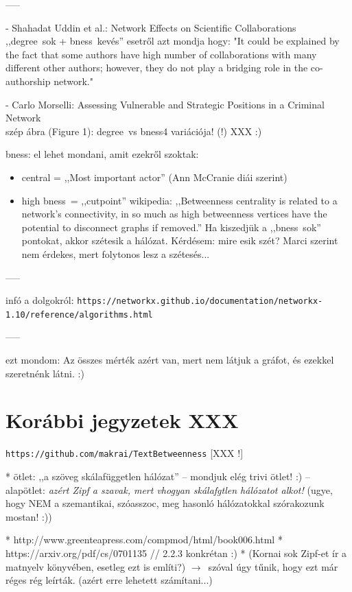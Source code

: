 \documentclass{llncs}
\newcommand{\nyil}{$\rightarrow$\ }
\newcommand{\code}[1]{\texttt{\small #1}}
\newcommand{\XXX}[1]{{\small \color{megjcolor} [XXX #1]}}
\newcommand{\XXXf}{\XXX{!}\ }
\newcommand{\smp}[1]{{\small (#1)}}
\newcommand{\degree}{degree} %
\newcommand{\bness}{bness}   %
\begin{document}
-----

 - Shahadat Uddin et al.:
Network Effects on Scientific Collaborations\\
%
,,\degree\ sok + \bness\ kevés'' esetről azt mondja hogy: 
"It could be explained by the fact that some authors have high number of collaborations with many different other authors; however, they do not play a bridging role in the co-authorship network."

- Carlo Morselli:
Assessing Vulnerable and Strategic Positions in a Criminal Network\\
%
szép ábra (Figure 1): \degree\ vs \bness 4 variációja! (!) XXX :)

\bness: el lehet mondani, amit ezekről szoktak:
\begin{itemize}
\item 
central = ,,Most important actor'' (Ann McCranie diái szerint)
\item 
high \bness\ = ,,cutpoint''
wikipedia: ,,Betweenness centrality is related to a network's connectivity, in so much as high betweenness vertices have the potential to disconnect graphs if removed.''
Ha kiszedjük a ,,\bness\ sok'' pontokat, akkor szétesik a hálózat.
Kérdésem: mire esik szét?
Marci szerint nem érdekes, mert folytonos lesz a szétesés...
\end{itemize}

-----

infó a dolgokról:
\code{https://networkx.github.io/documentation/networkx-1.10/reference/algorithms.html}

-----

ezt mondom:
Az összes mérték azért van, mert nem látjuk a gráfot,
és ezekkel szeretnénk látni. :)


\newpage %

\section{Korábbi jegyzetek XXX}

\code{https://github.com/makrai/TextBetweenness} \XXXf

 * ötlet: ,,a szöveg skálafüggetlen hálózat'' -- mondjuk elég trivi ötlet! :)
 -- alapötlet:
    \emph{azért Zipf a szavak, mert vhogyan skálafgtlen hálózatot alkot!}
    \smp{ugye, hogy NEM a szemantikai, szóasszoc, meg hasonló hálózatokkal
         szórakozunk mostan! :)}

 * http://www.greenteapress.com/compmod/html/book006.html
 * https://arxiv.org/pdf/cs/0701135 // 2.2.3 konkrétan :)
 * (Kornai sok Zipf-et ír a matnyelv könyvében, esetleg ezt is említi?)
 \nyil szóval úgy tűnik, hogy ezt már réges rég leírták.
    (azért erre lehetett számítani...)
\end{document}
